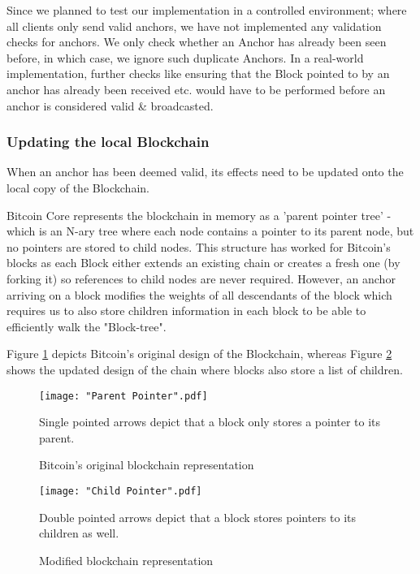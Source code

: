 Since we planned to test our implementation in a controlled environment; where all clients only send valid anchors, we have not implemented any validation checks for anchors. 
We only check whether an Anchor has already been seen before, in which case, we ignore such duplicate Anchors.
In a real-world implementation, further checks like ensuring that the Block pointed to by an anchor has already been received etc. would have to be performed before an anchor is considered valid \& broadcasted.

\subsubsection{Updating the local Blockchain}

When an anchor has been deemed valid, its effects need to be updated onto the local copy of the Blockchain.

Bitcoin Core represents the blockchain in memory as a 'parent pointer tree' - which is an N-ary tree where each node contains a pointer to its parent node, but no pointers are stored to child nodes. 
This structure has worked for Bitcoin's blocks as each Block either extends an existing chain or creates a fresh one (by forking it) so references to child nodes are never required.
However, an anchor arriving on a block modifies the weights of all descendants of the block which requires us to also store children information in each block to be able to efficiently walk the "Block-tree".

Figure \ref{fig-impl-parent-pointer} depicts Bitcoin's original design of the Blockchain, whereas 
Figure \ref{fig-impl-child-pointer} shows the updated design of the chain where blocks also store a list of children.

\begin{figure}[!htb]
    \centering
    \texttt{[image: "Parent Pointer".pdf]}
    \caption{Bitcoin's original blockchain representation}
    
    \medskip
    \footnotesize
    Single pointed arrows depict that a block only stores a pointer to its parent.
    \label{fig-impl-parent-pointer}
\end{figure}

\begin{figure}[!htb]
    \centering
    \texttt{[image: "Child Pointer".pdf]}
    \caption{Modified blockchain representation}
    
    \medskip
    \footnotesize
    Double pointed arrows depict that a block stores pointers to its children as well.
    \label{fig-impl-child-pointer}
\end{figure}

